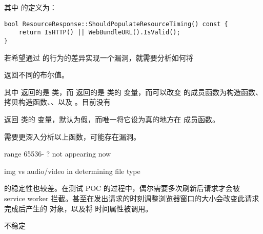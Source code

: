 其中  的定义为：

\begin{lstlisting}
bool ResourceResponse::ShouldPopulateResourceTiming() const {
    return IsHTTP() || WebBundleURL().IsValid();
}
\end{lstlisting}

若希望通过  的行为的差异实现一个漏洞，就需要分析如何将

 返回不同的布尔值。

其中  返回的是  类，而  返回的是  类的  变量，而可以改变  的成员函数为构造函数、拷贝构造函数、、以及 。目前没有

 返回  类的  变量，默认为假，而唯一将它设为真的地方在  成员函数。

需要更深入分析以上函数，可能存在漏洞。

range 65536- ? not appearing now

img vs audio/video in determining file type



 的稳定性也较差。在测试 POC 的过程中，偶尔需要多次刷新后请求才会被 service worker 拦截。甚至在发出请求的时刻调整浏览器窗口的大小会改变此请求完成后产生的  对象，以及将  时间属性被调用。


不稳定

